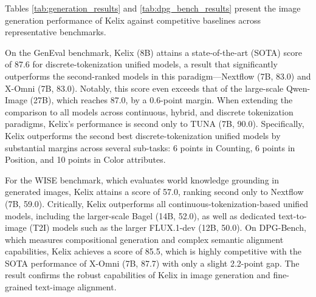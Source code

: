 \documentclass[11pt, a4paper, logo, copyright]{googledeepmind}
\begin{document}
Tables \ref{tab:generation_results} and \ref{tab:dpg_bench_results} present the image generation performance of Kelix against competitive baselines across representative benchmarks. 

On the GenEval benchmark, Kelix (8B) attains a state-of-the-art (SOTA) score of 87.6 for discrete-tokenization unified models, a result that significantly outperforms the second-ranked models in this paradigm—Nextflow (7B, 83.0) and X-Omni (7B, 83.0). Notably, this score even exceeds that of the large-scale Qwen-Image (27B), which reaches 87.0, by a 0.6-point margin. When extending the comparison to all models across continuous, hybrid, and discrete tokenization paradigms, Kelix’s performance is second only to TUNA (7B, 90.0). Specifically, Kelix outperforms the second best discrete-tokenization unified models by substantial margins across several sub-tasks: 6 points in Counting, 6 points in Position, and 10 points in Color attributes. %


For the WISE benchmark, which evaluates world knowledge grounding in generated images, Kelix attains a score of 57.0, ranking second only to Nextflow (7B, 59.0). Critically, Kelix outperforms all continuous-tokenization-based unified models, including the larger-scale Bagel (14B, 52.0), as well as dedicated text-to-image (T2I) models such as the larger FLUX.1-dev (12B, 50.0). On DPG-Bench, which measures compositional generation and complex semantic alignment capabilities, Kelix achieves a score of 85.5, which is highly competitive with the SOTA performance of X-Omni (7B, 87.7) with only a slight 2.2-point gap. The result confirms the robust capabilities of Kelix in image generation and fine-grained text-image alignment.
\end{document}
